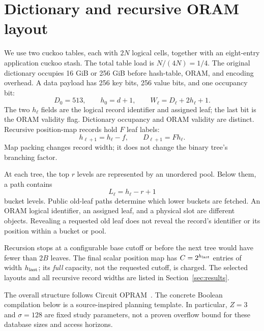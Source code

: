 \documentclass[11pt]{article}
\begin{document}
\section{Dictionary and recursive ORAM layout}
\label{sec:layout}
We use two cuckoo tables, each with $2N$ logical cells, together with an
eight-entry application cuckoo stash. The total table load is $N/(4N)=1/4$.
The original dictionary occupies 16 GiB or 256 GiB before hash-table, ORAM,
and encoding overhead. A data payload has 256 key bits, 256 value bits, and
one occupancy bit:
\begin{equation}
 D_0=513,\qquad h_0=d+1,\qquad W_\ell=D_\ell+2h_\ell+1.
\end{equation}
The two $h_\ell$ fields are the logical record identifier and assigned leaf;
the last bit is the ORAM validity flag. Dictionary occupancy and ORAM
validity are distinct. Recursive position-map records hold $F$ leaf labels:
\begin{equation}
 h_{\ell+1}=h_\ell-f,\qquad D_{\ell+1}=Fh_\ell.
\end{equation}
Map packing changes record width; it does not change the binary tree's
branching factor.

At each tree, the top $r$ levels are represented by an unordered pool.
Below them, a path contains
\begin{equation}
 L_\ell=h_\ell-r+1
\end{equation}
bucket levels. Public old-leaf paths determine which lower buckets are
fetched. An ORAM logical identifier, an assigned leaf, and a physical slot
are different objects. Revealing a requested old leaf does not reveal the
record's identifier or its position within a bucket or pool.

Recursion stops at a configurable base cutoff or before the next tree would
have fewer than $2B$ leaves. The final scalar position map has
$C=2^{h_{\rm last}}$ entries of width $h_{\rm last}$; its \emph{full} capacity,
not the requested cutoff, is charged. The selected layouts and all recursive
record widths are listed in Section~\ref{sec:results}.

The overall structure follows Circuit OPRAM~\cite{chan2017}. The concrete
Boolean compilation below is a source-inspired planning template. In
particular, $Z=3$ and $\sigma=128$ are fixed study parameters, not a proven
overflow bound for these database sizes and access horizons.



\end{document}
